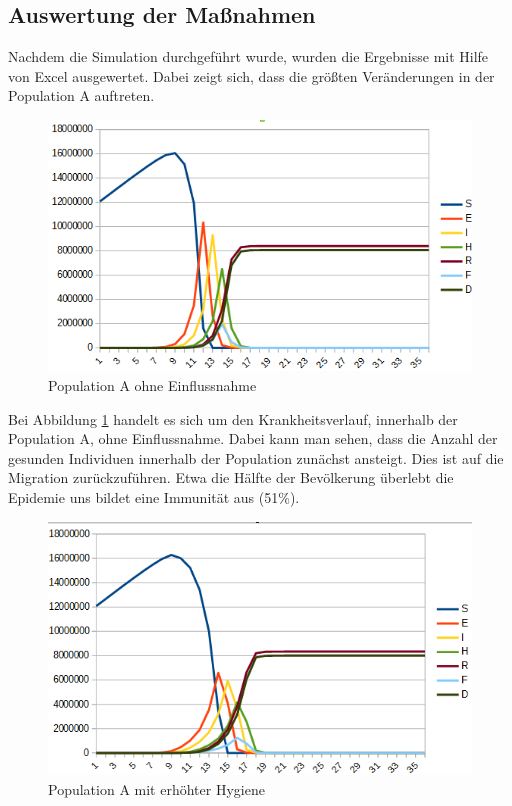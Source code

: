 \subsection{Auswertung der Maßnahmen}\label{ssec:actions:sim}

\ellen
Nachdem die Simulation durchgeführt wurde, wurden die Ergebnisse mit Hilfe von Excel ausgewertet. Dabei zeigt sich, dass die größten Veränderungen in der Population A auftreten.\\
\begin{figure}
 \includegraphics[width=1\textwidth]{massnahmen/A0}
\caption{Population A ohne Einflussnahme}
\label{fig:ssec:actions:A0}
\end{figure}
 Bei Abbildung \ref{fig:ssec:actions:A0} handelt es sich um den Krankheitsverlauf, innerhalb der Population A, ohne Einflussnahme. Dabei kann man sehen, dass die Anzahl der gesunden Individuen innerhalb der Population zunächst ansteigt. Dies ist auf die Migration zurückzuführen. Etwa die Hälfte der Bevölkerung überlebt die Epidemie uns bildet eine Immunität aus (51\%).\\
 \begin{figure}
 \includegraphics[width=1\textwidth]{massnahmen/A1}
\caption{Population A mit erhöhter Hygiene}
\label{fig:ssec:actions:A1}
\end{figure}
